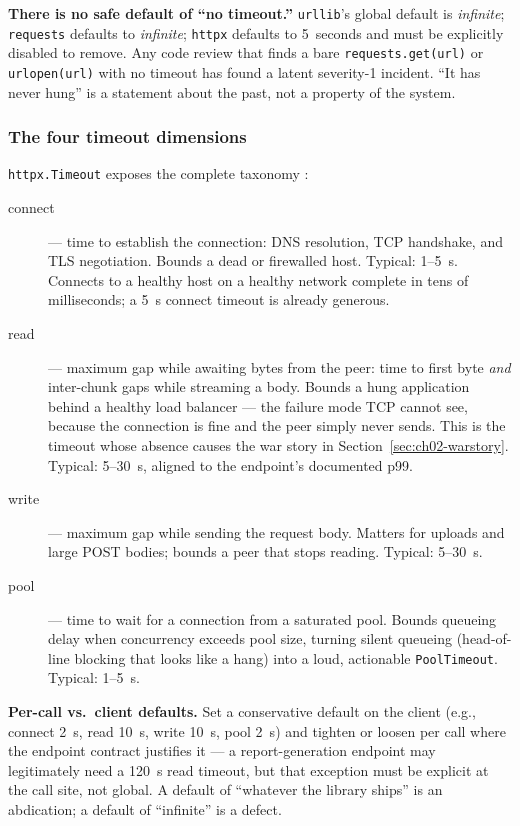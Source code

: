 \begin{warningbox}
\textbf{There is no safe default of ``no timeout.''} \texttt{urllib}'s global
default is \emph{infinite}; \texttt{requests} defaults to \emph{infinite};
\texttt{httpx} defaults to 5~seconds and must be explicitly disabled to
remove. Any code review that finds a bare \texttt{requests.get(url)} or
\texttt{urlopen(url)} with no timeout has found a latent severity-1 incident.
``It has never hung'' is a statement about the past, not a property of the
system.
\end{warningbox}

\subsubsection{The four timeout dimensions}

\texttt{httpx.Timeout} exposes the complete taxonomy
\cite{httpxdocs}:

\begin{description}
  \item[connect] --- time to establish the connection: DNS resolution, TCP
        handshake, and TLS negotiation. Bounds a dead or firewalled host.
        Typical: 1--5~s. Connects to a healthy host on a healthy network
        complete in tens of milliseconds; a 5~s connect timeout is already
        generous.
  \item[read] --- maximum gap while awaiting bytes from the peer: time to
        first byte \emph{and} inter-chunk gaps while streaming a body. Bounds
        a hung application behind a healthy load balancer --- the failure mode
        TCP cannot see, because the connection is fine and the peer simply
        never sends. This is the timeout whose absence causes the war story in
        Section~\ref{sec:ch02-warstory}. Typical: 5--30~s, aligned to the
        endpoint's documented p99.
  \item[write] --- maximum gap while sending the request body. Matters for
        uploads and large POST bodies; bounds a peer that stops reading.
        Typical: 5--30~s.
  \item[pool] --- time to wait for a connection from a saturated pool. Bounds
        queueing delay when concurrency exceeds pool size, turning silent
        queueing (head-of-line blocking that looks like a hang) into a loud,
        actionable \texttt{PoolTimeout}. Typical: 1--5~s.
\end{description}

\textbf{Per-call vs.\ client defaults.} Set a conservative default on the
client (e.g., connect 2~s, read 10~s, write 10~s, pool 2~s) and tighten or
loosen per call where the endpoint contract justifies it --- a report-generation
endpoint may legitimately need a 120~s read timeout, but that exception must
be explicit at the call site, not global. A default of ``whatever the library
ships'' is an abdication; a default of ``infinite'' is a defect.

